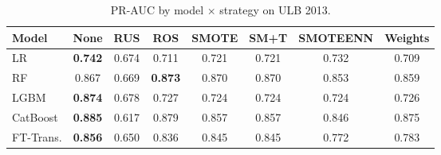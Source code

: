 \begin{table}[ht!]
\centering
\caption{PR-AUC by model $\times$ strategy on ULB 2013.}
\label{tab:factorial_ulb_prauc}
\begin{tabular}{l c c c c c c c}
\toprule
Model & None & RUS & ROS & SMOTE & SM+T & SMOTEENN & Weights \\
\midrule
LR         & \textbf{0.742} & 0.674 & 0.711 & 0.721 & 0.721 & 0.732 & 0.709 \\
RF         & 0.867 & 0.669 & \textbf{0.873} & 0.870 & 0.870 & 0.853 & 0.859 \\
LGBM       & \textbf{0.874} & 0.678 & 0.727 & 0.724 & 0.724 & 0.724 & 0.726 \\
CatBoost   & \textbf{0.885} & 0.617 & 0.879 & 0.857 & 0.857 & 0.846 & 0.875 \\
FT-Trans.  & \textbf{0.856} & 0.650 & 0.836 & 0.845 & 0.845 & 0.772 & 0.783 \\
\bottomrule
\end{tabular}
\end{table}